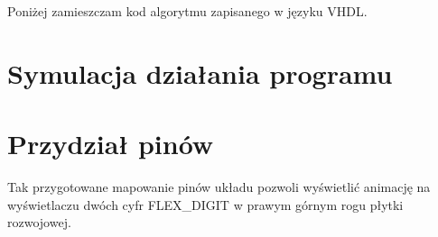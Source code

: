 \documentclass{article}
\begin{document}
        
    
        Poniżej zamieszczam kod algorytmu zapisanego w języku VHDL. 
        
    
    \section{Symulacja działania programu}
    
    \section{Przydział pinów}
        
        Tak przygotowane mapowanie pinów układu pozwoli wyświetlić animację na wyświetlaczu dwóch cyfr FLEX\_DIGIT w prawym górnym rogu płytki rozwojowej. 
    
      
      
    
    
\end{document}
